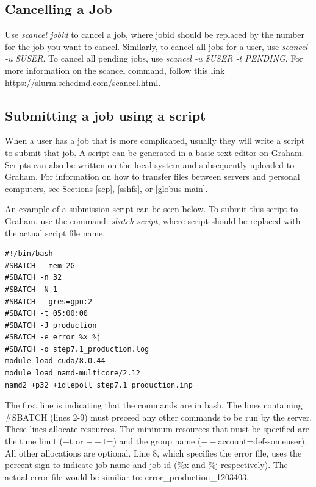 \documentclass[12pt]{article}
\begin{document}
\subsection{Cancelling a Job}

\quad Use \textit{scancel jobid} to cancel a job, where jobid should be replaced by the number for the job you want to cancel. Similarly, to cancel all jobs for a user, use \textit{scancel -u \$USER}. To cancel all pending jobs, use \textit{scancel -u \$USER -t PENDING}. For more information on the scancel command, follow this link \url{https://slurm.schedmd.com/scancel.html}.

\subsection{Submitting a job using a script}

\quad When a user has a job that is more complicated, usually they will write a script to submit that job. A script can be generated in a basic text editor on Graham. Scripts can also be written on the local system and subsequently uploaded to Graham. For information on how to transfer files between servers and personal computers, see Sections \ref{scp}, \ref{sshfs}, or \ref{globus-main}. 

\quad An example of a submission script can be seen below. To submit this script to Graham, use the command: \textit{sbatch script}, where script should be replaced with the actual script file name.

\begin{lstlisting}
#!/bin/bash
#SBATCH --mem 2G
#SBATCH -n 32
#SBATCH -N 1
#SBATCH --gres=gpu:2
#SBATCH -t 05:00:00
#SBATCH -J production
#SBATCH -e error_%x_%j
#SBATCH -o step7.1_production.log
module load cuda/8.0.44
module load namd-multicore/2.12
namd2 +p32 +idlepoll step7.1_production.inp
\end{lstlisting}

\quad The first line is indicating that the commands are in bash. The lines containing \#SBATCH (lines 2-9) must preceed any other commands to be run by the server. These lines allocate resources. The minimum resources that must be specified are the time limit ($-$t or $--$t=) and the group name ($--$account=def-someuser). All other allocations are optional. Line 8, which specifies the error file, uses the percent sign to indicate job name and job id (\%x and \%j respectively). The actual error file would be similiar to: error\_production\_1203403.
\end{document}
